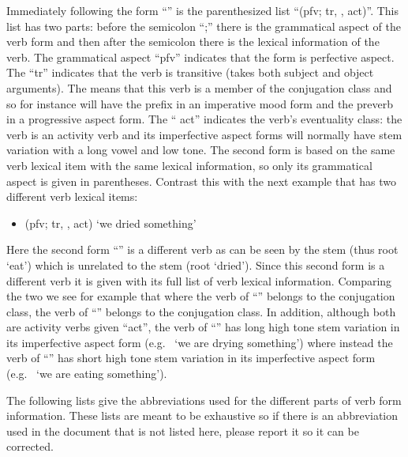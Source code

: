 \documentclass[12pt,letterpaper,oneside,article]{memoir}
\begin{document}
Immediately following the form “” is the parenthesized list “(pfv; tr, ,  act)”.
This list has two parts: before the semicolon “;” there is the grammatical aspect of the verb form and then after the semicolon there is the lexical information of the verb.
The grammatical aspect “pfv” indicates that the form is perfective aspect.
The “tr” indicates that the verb is transitive (takes both subject and object arguments).
The  means that this verb is a member of the  conjugation class and so for instance will have the prefix  in an imperative mood form and the preverb  in a progressive aspect form.
The “ act” indicates the verb’s eventuality class: the verb is an activity verb and its imperfective aspect forms will normally have  stem variation with a long vowel and low tone.
The second form  is based on the same verb lexical item with the same lexical information, so only its grammatical aspect is given in parentheses.
Contrast this with the next example that has two different verb lexical items:

\begin{itemize}
\item	{} (pfv; tr, ,  act) ‘we dried something’
\end{itemize}

Here the second form “” is a different verb as can be seen by the stem  (thus root  ‘eat’) which is unrelated to the stem  (root  ‘dried’).
Since this second form is a different verb it is given with its full list of verb lexical information.
Comparing the two we see for example that where the verb of “” belongs to the  conjugation class, the verb of “” belongs to the  conjugation class.
In addition, although both are activity verbs given “act”, the verb of “” has  long high tone stem variation in its imperfective aspect form (e.g.\  ‘we are drying something’) where instead the verb of “” has  short high tone stem variation in its imperfective aspect form (e.g.\  ‘we are eating something’).

The following lists give the abbreviations used for the different parts of verb form information.
These lists are meant to be exhaustive so if there is an abbreviation used in the document that is not listed here, please report it so it can be corrected.
\end{document}

